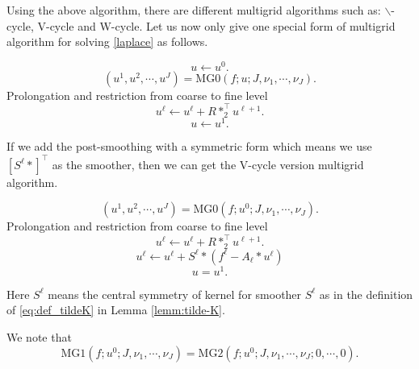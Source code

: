 Using the above algorithm, there are different multigrid algorithms such as: $\backslash$-cycle, V-cycle and W-cycle.
Let us now only give one special form of multigrid algorithm for solving \eqref{laplace} as follows.
\begin{breakablealgorithm}%
	\caption{$u = {\text{MG1}}(f; u^0; J,\nu_1, \cdots, \nu_J)$}
	\label{alg:L-Slash1}
	\begin{algorithmic}
		\State 
		$$
		u \leftarrow u^0.
		$$
		\State
		$$
		(u^{1}, u^2, \cdots, u^J) = {\text{MG0}}(f; u; J,\nu_1, \cdots, \nu_J).
		$$
		\State Prolongation and restriction from coarse to fine level
		\State
		$$
		u^{\ell} \leftarrow u^{\ell} + R  \ast_2^{\top} u^{\ell+1}.
		$$
		\EndFor
		\State
		$$
		u \leftarrow u^{1}.
		$$
	\end{algorithmic}
\end{breakablealgorithm}

If we add the post-smoothing with a symmetric form which means we 
use $[S^\ell \ast ]^\top$ as the smoother, then we can get the V-cycle
version multigrid algorithm.

\begin{breakablealgorithm}%
	\caption{$u = {\text{MG2}}(f; u^0; J,\nu_1, \cdots, \nu_J; \nu'_1, \cdots, \nu'_J )$}
	\label{alg:V-cycle}
	\begin{algorithmic}
		\State 
		$$
		(u^{1}, u^2, \cdots, u^J) = {\text{MG0}}(f; u^0; J,\nu_1, \cdots, \nu_J).
		$$
		\State Prolongation and restriction from coarse to fine level
		\For{$\ell = J-1:1$}
		\State
		$$
		u^{\ell} \leftarrow u^{\ell} + R  \ast_2^{\top} u^{\ell+1}.
		$$
		\For{$i = 1:\nu'_\ell$}
		\State
		$$
		u^{\ell} \leftarrow u^{\ell} + S^\ell \ast (f^\ell - A_\ell \ast u^{\ell})
		$$
		\EndFor
		\EndFor
		\State 
		$$
		u = u^{1}.
		$$
	\end{algorithmic}
\end{breakablealgorithm}
Here $S^\ell $ means the central symmetry of kernel for smoother $S^\ell$ as in the 
definition of \eqref{eq:def_tildeK} in Lemma \ref{lemm:tilde-K}. 

We note that 
$$
\text{MG1}(f; u^0; J,\nu_1, \cdots, \nu_J) = {\text{MG2}}(f; u^0; J,\nu_1, \cdots, \nu_J; 0, \cdots, 0).
$$


